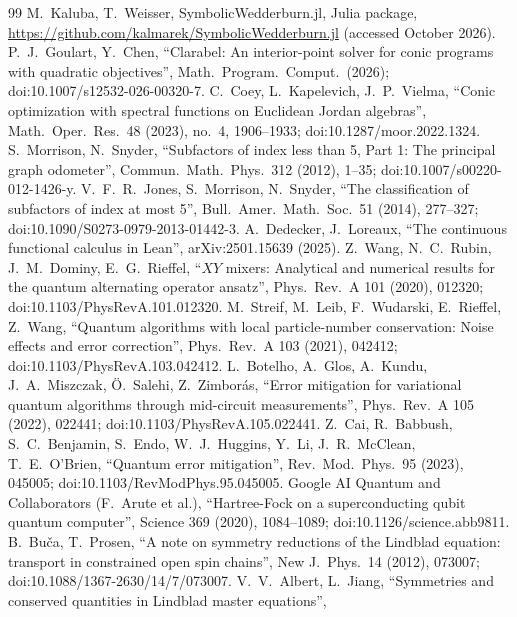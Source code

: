 \documentclass[11pt]{article}
\begin{document}
{\begin{thebibliography}{99}
 M.~Kaluba, T.~Weisser, SymbolicWedderburn.jl, Julia package,
  \url{https://github.com/kalmarek/SymbolicWedderburn.jl} (accessed October 2026).
 P.~J.~Goulart, Y.~Chen, ``Clarabel: An interior-point solver for conic programs with quadratic
  objectives'', Math.\ Program.\ Comput.\ (2026); doi:10.1007/s12532-026-00320-7.
 C.~Coey, L.~Kapelevich, J.~P.~Vielma, ``Conic optimization with spectral functions on Euclidean
  Jordan algebras'', Math.\ Oper.\ Res.\ 48 (2023), no.~4, 1906--1933; doi:10.1287/moor.2022.1324.
 S.~Morrison, N.~Snyder, ``Subfactors of index less than 5, Part 1: The principal graph
  odometer'', Commun.\ Math.\ Phys.\ 312 (2012), 1--35; doi:10.1007/s00220-012-1426-y.
 V.~F.~R.~Jones, S.~Morrison, N.~Snyder, ``The classification of subfactors of index at most 5'',
  Bull.\ Amer.\ Math.\ Soc.\ 51 (2014), 277--327; doi:10.1090/S0273-0979-2013-01442-3.
 A.~Dedecker, J.~Loreaux, ``The continuous functional calculus in Lean'', arXiv:2501.15639
  (2025).
 Z.~Wang, N.~C.~Rubin, J.~M.~Dominy, E.~G.~Rieffel, ``$XY$ mixers: Analytical and numerical results
  for the quantum alternating operator ansatz'', Phys.\ Rev.\ A 101 (2020), 012320; doi:10.1103/PhysRevA.101.012320.
 M.~Streif, M.~Leib, F.~Wudarski, E.~Rieffel, Z.~Wang, ``Quantum algorithms with local
  particle-number conservation: Noise effects and error correction'', Phys.\ Rev.\ A 103 (2021), 042412;
  doi:10.1103/PhysRevA.103.042412.
 L.~Botelho, A.~Glos, A.~Kundu, J.~A.~Miszczak, \"O.~Salehi, Z.~Zimbor\'as, ``Error mitigation for
  variational quantum algorithms through mid-circuit measurements'', Phys.\ Rev.\ A 105 (2022), 022441;
  doi:10.1103/PhysRevA.105.022441.
 Z.~Cai, R.~Babbush, S.~C.~Benjamin, S.~Endo, W.~J.~Huggins, Y.~Li, J.~R.~McClean, T.~E.~O'Brien,
  ``Quantum error mitigation'', Rev.\ Mod.\ Phys.\ 95 (2023), 045005; doi:10.1103/RevModPhys.95.045005.
 Google AI Quantum and Collaborators (F.~Arute et al.), ``Hartree-Fock on a superconducting qubit
  quantum computer'', Science 369 (2020), 1084--1089; doi:10.1126/science.abb9811.
 B.~Bu\v{c}a, T.~Prosen, ``A note on symmetry reductions of the Lindblad equation: transport in
  constrained open spin chains'', New J.\ Phys.\ 14 (2012), 073007; doi:10.1088/1367-2630/14/7/073007.
 V.~V.~Albert, L.~Jiang, ``Symmetries and conserved quantities in Lindblad master equations'',

\end{thebibliography}}
\end{document}
